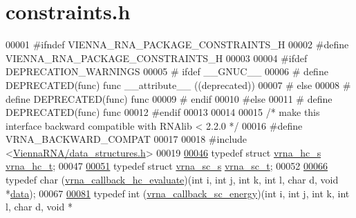 \hypertarget{constraints_8h_source}{}\section{constraints.\+h}
\label{constraints_8h_source}

\begin{DoxyCode}
00001 \textcolor{preprocessor}{#ifndef VIENNA\_RNA\_PACKAGE\_CONSTRAINTS\_H}
00002 \textcolor{preprocessor}{#define VIENNA\_RNA\_PACKAGE\_CONSTRAINTS\_H}
00003 
00004 \textcolor{preprocessor}{#ifdef DEPRECATION\_WARNINGS}
00005 \textcolor{preprocessor}{# ifdef \_\_GNUC\_\_}
00006 \textcolor{preprocessor}{#  define DEPRECATED(func) func \_\_attribute\_\_ ((deprecated))}
00007 \textcolor{preprocessor}{# else}
00008 \textcolor{preprocessor}{#  define DEPRECATED(func) func}
00009 \textcolor{preprocessor}{# endif}
00010 \textcolor{preprocessor}{#else}
00011 \textcolor{preprocessor}{# define DEPRECATED(func) func}
00012 \textcolor{preprocessor}{#endif}
00013 
00014 
00015 \textcolor{comment}{/* make this interface backward compatible with RNAlib < 2.2.0 */}
00016 \textcolor{preprocessor}{#define VRNA\_BACKWARD\_COMPAT}
00017 
00018 \textcolor{preprocessor}{#include <\hyperlink{data__structures_8h}{ViennaRNA/data\_structures.h}>}
00019 
\hypertarget{constraints_8h_source_l00046}{}\hyperlink{group__constraints_gac7e4c4f8abe3163a68110c5bff24e01d}{00046} \textcolor{keyword}{typedef} \textcolor{keyword}{struct  }\hyperlink{group__hard__constraints_structvrna__hc__s}{vrna\_hc\_s} \hyperlink{group__hard__constraints_structvrna__hc__s}{vrna\_hc\_t};
00047 
\hypertarget{constraints_8h_source_l00051}{}\hyperlink{group__constraints_ga75401ce219ef8dbcceb672db82d434c6}{00051} \textcolor{keyword}{typedef} \textcolor{keyword}{struct  }\hyperlink{group__soft__constraints_structvrna__sc__s}{vrna\_sc\_s} \hyperlink{group__soft__constraints_structvrna__sc__s}{vrna\_sc\_t};
00052 
\hypertarget{constraints_8h_source_l00066}{}\hyperlink{group__hard__constraints_ga16eb71ac9a7a35369be2eaa9d8f8dfa0}{00066} \textcolor{keyword}{typedef} char (\hyperlink{group__hard__constraints_ga16eb71ac9a7a35369be2eaa9d8f8dfa0}{vrna\_callback\_hc\_evaluate})(\textcolor{keywordtype}{int} i, \textcolor{keywordtype}{int} j, \textcolor{keywordtype}{int} k, \textcolor{keywordtype}{int} l, \textcolor{keywordtype}{char} d, \textcolor{keywordtype}{void} 
      *\hyperlink{group__soft__constraints_a7574680143df97b9029146c2150bf06d}{data});
00067 
\hypertarget{constraints_8h_source_l00081}{}\hyperlink{group__generalized__sc_gaf38062858ac25fd5e240c2c3b0b0b780}{00081} \textcolor{keyword}{typedef} int (\hyperlink{group__generalized__sc_gaf38062858ac25fd5e240c2c3b0b0b780}{vrna\_callback\_sc\_energy})(\textcolor{keywordtype}{int} i, \textcolor{keywordtype}{int} j, \textcolor{keywordtype}{int} k, \textcolor{keywordtype}{int} l, \textcolor{keywordtype}{char} d, \textcolor{keywordtype}{void} *

\end{DoxyCode}

